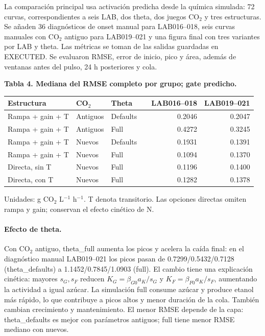 \documentclass[10pt,a4paper]{article}
\begin{document}
La comparación principal usa activación predicha desde la química simulada:
72 curvas, correspondientes a seis LAB, dos theta, dos juegos CO\(_2\) y tres
estructuras. Se añaden 36 diagnósticos de onset manual para LAB016--018,
seis curvas manuales con CO\(_2\) antiguo para LAB019--021 y una figura final
con tres variantes por LAB y theta. Las métricas se toman de las salidas
guardadas en EXECUTED. Se evaluaron RMSE, error de inicio, pico y área, además
de ventanas antes del pulso, 24 h posteriores y cola.

\begin{center}\small
\textbf{Tabla 4. Mediana del RMSE completo por grupo; gate predicho.}\par\medskip
\begin{tabular}{@{}llllrr@{}}
\toprule
Estructura & CO\(_2\) & Theta && LAB016--018 & LAB019--021\\\midrule
Rampa + gain + T & Antiguos & Defaults && 0.2046 & 0.2047\\
Rampa + gain + T & Antiguos & Full && 0.4272 & 0.3245\\
Rampa + gain + T & Nuevos & Defaults && 0.1931 & 0.1391\\
Rampa + gain + T & Nuevos & Full && 0.1094 & 0.1370\\
Directa, sin T & Nuevos & Full && 0.1196 & 0.1400\\
Directa, con T & Nuevos & Full && 0.1282 & 0.1378\\
\bottomrule
\end{tabular}\par\smallskip
Unidades: g CO\(_2\) L$^{-1}$ h$^{-1}$. T denota transitorio. Las opciones
directas omiten rampa y gain; conservan el efecto cinético de N.
\end{center}

\paragraph{Efecto de theta.}
Con CO\(_2\) antiguo, theta\_full aumenta los picos y acelera la caída final:
en el diagnóstico manual LAB019--021 los picos pasan de
0.7299/0.5432/0.7128 (theta\_defaults) a 1.1452/0.7845/1.0903 (full).
El cambio tiene una explicación cinética: mayores $s_G,s_F$ reducen
$K_G=\beta_{G0}a_K/s_G$ y $K_F=\beta_{F0}a_K/s_F$, aumentando la actividad
a igual azúcar. La simulación full consume azúcar y produce etanol más rápido,
lo que contribuye a picos altos y menor duración de la cola. También cambian
crecimiento y mantenimiento. El menor RMSE depende de la capa: theta\_defaults
es mejor con parámetros antiguos; full tiene menor RMSE mediano con nuevos.
\end{document}
